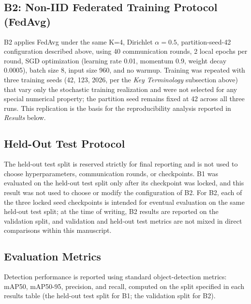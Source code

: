 \documentclass[11pt]{article}
\begin{document}
\subsection{B2: Non-IID Federated Training Protocol (FedAvg)}
B2 applies FedAvg \cite{mcmahan2017fedavg,konecny2016} under the same K=4, Dirichlet $\alpha=0.5$, partition-seed-42 configuration described above, using 40 communication rounds, 2 local epochs per round, SGD optimization (learning rate 0.01, momentum 0.9, weight decay 0.0005), batch size 8, input size 960, and no warmup. Training was repeated with three training seeds (42, 123, 2026, per the \emph{Key Terminology} subsection above) that vary only the stochastic training realization and were not selected for any special numerical property; the partition seed remains fixed at 42 across all three runs. This replication is the basis for the reproducibility analysis reported in \emph{Results} below.

\subsection{Held-Out Test Protocol}
The held-out test split is reserved strictly for final reporting and is not used to choose hyperparameters, communication rounds, or checkpoints. B1 was evaluated on the held-out test split only after its checkpoint was locked, and this result was not used to choose or modify the configuration of B2. For B2, each of the three locked seed checkpoints is intended for eventual evaluation on the same held-out test split; at the time of writing, B2 results are reported on the validation split, and validation and held-out test metrics are not mixed in direct comparisons within this manuscript.

\subsection{Evaluation Metrics}
Detection performance is reported using standard object-detection metrics: mAP50, mAP50-95, precision, and recall, computed on the split specified in each results table (the held-out test split for B1; the validation split for B2).
\end{document}
